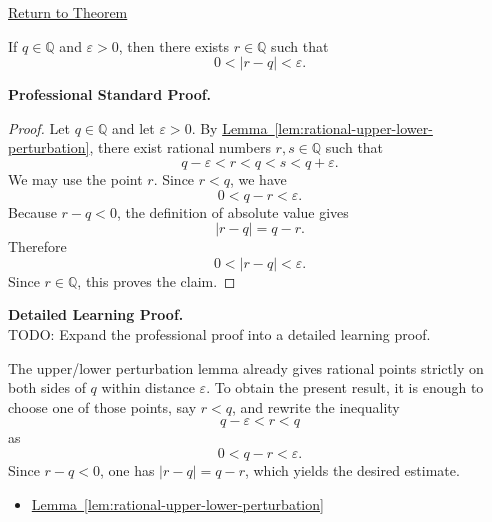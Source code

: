 \newpage
{}
\label{prf:rational-perturbation-lemma}

\begin{remark*}[Return]
\hyperref[lem:rational-perturbation-lemma]{Return to Theorem}
\end{remark*}

\begin{theorem*}
If $q\in\mathbb{Q}$ and $\varepsilon>0$, then there exists $r\in\mathbb{Q}$
such that
\[
0<|r-q|<\varepsilon.
\]
\end{theorem*}

\textbf{Professional Standard Proof.}~\\
\begin{proof}
Let $q\in\mathbb{Q}$ and let $\varepsilon>0$. By
\hyperref[lem:rational-upper-lower-perturbation]{Lemma~\ref*{lem:rational-upper-lower-perturbation}},
there exist rational numbers $r,s\in\mathbb{Q}$ such that
\[
q-\varepsilon<r<q<s<q+\varepsilon.
\]
We may use the point $r$. Since $r<q$, we have
\[
0<q-r<\varepsilon.
\]
Because $r-q<0$, the definition of absolute value gives
\[
|r-q|=q-r.
\]
Therefore
\[
0<|r-q|<\varepsilon.
\]
Since $r\in\mathbb{Q}$, this proves the claim.
\end{proof}

\textbf{Detailed Learning Proof.}~\\
TODO: Expand the professional proof into a detailed learning proof.


\begin{remark*}
The upper/lower perturbation lemma already gives rational points strictly on
both sides of $q$ within distance $\varepsilon$. To obtain the present result,
it is enough to choose one of those points, say $r<q$, and rewrite the
inequality
\[
q-\varepsilon<r<q
\]
as
\[
0<q-r<\varepsilon.
\]
Since $r-q<0$, one has $|r-q|=q-r$, which yields the desired estimate.
\end{remark*}

\begin{dependencies}
\begin{itemize}
  \item \hyperref[lem:rational-upper-lower-perturbation]{Lemma~\ref*{lem:rational-upper-lower-perturbation}}
\end{itemize}
\end{dependencies}

